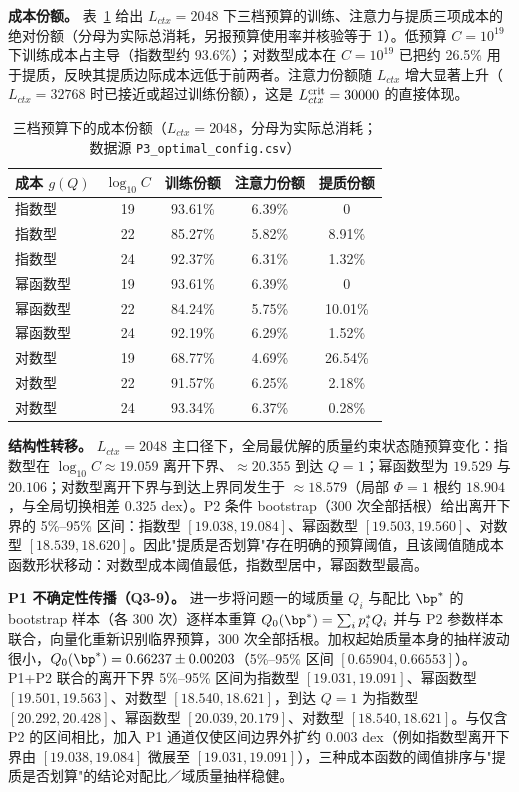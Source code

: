 \textbf{成本份额。} 表~\ref{tab:q3share} 给出 $L_{ctx}=2048$ 下三档预算的训练、注意力与提质三项成本的绝对份额（分母为实际总消耗，另报预算使用率并核验等于 1）。低预算 $C=10^{19}$ 下训练成本占主导（指数型约 93.6\%）；对数型成本在 $C=10^{19}$ 已把约 26.5\% 用于提质，反映其提质边际成本远低于前两者。注意力份额随 $L_{ctx}$ 增大显著上升（$L_{ctx}=32768$ 时已接近或超过训练份额），这是 $L_{ctx}^{\rm crit}=30000$ 的直接体现。

\begin{table}[H]
\centering\small
\caption{三档预算下的成本份额（$L_{ctx}=2048$，分母为实际总消耗；数据源 \texttt{P3\_optimal\_config.csv}）}
\label{tab:q3share}
\begin{tabularx}{\textwidth}{@{}l c c c c@{}}
\toprule
成本 $g(Q)$ & $\log_{10}C$ & 训练份额 & 注意力份额 & 提质份额 \\
\midrule
指数型 & 19 & 93.61\% & 6.39\% & 0 \\
指数型 & 22 & 85.27\% & 5.82\% & 8.91\% \\
指数型 & 24 & 92.37\% & 6.31\% & 1.32\% \\
幂函数型 & 19 & 93.61\% & 6.39\% & 0 \\
幂函数型 & 22 & 84.24\% & 5.75\% & 10.01\% \\
幂函数型 & 24 & 92.19\% & 6.29\% & 1.52\% \\
对数型 & 19 & 68.77\% & 4.69\% & 26.54\% \\
对数型 & 22 & 91.57\% & 6.25\% & 2.18\% \\
对数型 & 24 & 93.34\% & 6.37\% & 0.28\% \\
\bottomrule
\end{tabularx}
\end{table}

\textbf{结构性转移。} $L_{ctx}=2048$ 主口径下，全局最优解的质量约束状态随预算变化：指数型在 $\log_{10}C\approx19.059$ 离开下界、$\approx20.355$ 到达 $Q=1$；幂函数型为 $19.529$ 与 $20.106$；对数型离开下界与到达上界同发生于 $\approx18.579$（局部 $\Phi=1$ 根约 $18.904$，与全局切换相差 $0.325$ dex）。P2 条件 bootstrap（300 次全部括根）给出离开下界的 5\%–95\% 区间：指数型 $[19.038,19.084]$、幂函数型 $[19.503,19.560]$、对数型 $[18.539,18.620]$。因此"提质是否划算"存在明确的预算阈值，且该阈值随成本函数形状移动：对数型成本阈值最低，指数型居中，幂函数型最高。

\textbf{P1 不确定性传播（Q3-9）。} 进一步将问题一的域质量 $Q_i$ 与配比 $\bp^*$ 的 bootstrap 样本（各 300 次）逐样本重算 $Q_0(\bp^*)=\sum_i p_i^* Q_i$ 并与 P2 参数样本联合，向量化重新识别临界预算，300 次全部括根。加权起始质量本身的抽样波动很小，$Q_0(\bp^*)=0.66237\pm0.00203$（5\%–95\% 区间 $[0.65904,0.66553]$）。P1+P2 联合的离开下界 5\%–95\% 区间为指数型 $[19.031,19.091]$、幂函数型 $[19.501,19.563]$、对数型 $[18.540,18.621]$，到达 $Q=1$ 为指数型 $[20.292,20.428]$、幂函数型 $[20.039,20.179]$、对数型 $[18.540,18.621]$。与仅含 P2 的区间相比，加入 P1 通道仅使区间边界外扩约 $0.003$ dex（例如指数型离开下界由 $[19.038,19.084]$ 微展至 $[19.031,19.091]$），三种成本函数的阈值排序与"提质是否划算"的结论对配比／域质量抽样稳健。

